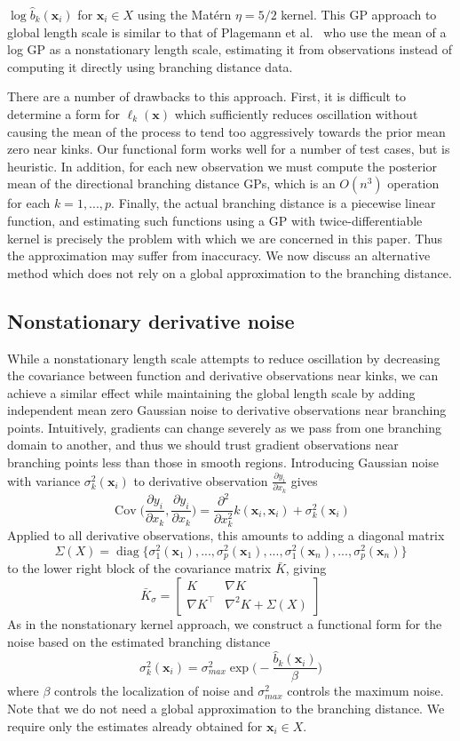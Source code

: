 \documentclass{article}
\newcommand{\mat}[1]{\begin{bmatrix}#1\end{bmatrix}}
\renewcommand{\vec}[1]{\mathbf{#1}}
\DeclareMathOperator{\Cov}{Cov}
\DeclareMathOperator{\diag}{diag}
\begin{document}
$\log \hat{b}_k(\vec{x}_i)$ for $\vec{x}_i \in X$ using the Mat\'ern $\eta = 5/2$ kernel. This GP approach to global length scale is similar to that of Plagemann et al.~\cite{plagemann2008nonstationary} who use the mean of a log GP as a nonstationary length scale, estimating it from observations instead of computing it directly using branching distance data.

There are a number of drawbacks to this approach. First, it is difficult to determine a form for $\ell_k(\vec{x})$ which sufficiently reduces oscillation without causing the mean of the process to tend too aggressively towards the prior mean zero near kinks. Our functional form works well for a number of test cases, but is heuristic. In addition, for each new observation we must compute the posterior mean of the directional branching distance GPs, which is an $O(n^3)$ operation for each $k=1,...,p$. Finally, the actual branching distance is a piecewise linear function, and estimating such functions using a GP with twice-differentiable kernel is precisely the problem with which we are concerned in this paper. Thus the approximation may suffer from inaccuracy. We now discuss an alternative method which does not rely on a global approximation to the branching distance.

\subsection{Nonstationary derivative noise}
While a nonstationary length scale attempts to reduce oscillation by decreasing the covariance between function and derivative observations near kinks, we can achieve a similar effect while maintaining the global length scale by adding independent mean zero Gaussian noise to derivative observations near branching points. Intuitively, gradients can change severely as we pass from one branching domain to another, and thus we should trust gradient observations near branching points less than those in smooth regions. Introducing Gaussian noise with variance $\sigma^2_k(\vec{x}_i)$ to derivative observation $\frac{\partial y_i}{\partial x_k}$ gives
$$ \Cov\Big(\frac{\partial y_i}{\partial x_k}, \frac{\partial y_i}{\partial x_k}\Big) = \frac{\partial^2}{\partial x_k^2} k(\vec{x}_i, \vec{x}_i) + \sigma^2_k(\vec{x}_i) $$
Applied to all derivative observations, this amounts to adding a diagonal matrix
$$\Sigma(X) = \diag\{\sigma^2_1(\vec{x}_1),...,\sigma^2_p(\vec{x}_1),...,\sigma^2_1(\vec{x}_n),...,\sigma^2_p(\vec{x}_n)\}$$
to the lower right block of the covariance matrix $\bar{K}$, giving
$$ \bar{K}_\sigma = \mat{K & \nabla K \\ \nabla K^\top & \nabla^2 K + \Sigma(X)} $$
As in the nonstationary kernel approach, we construct a functional form for the noise based on the estimated branching distance
$$ \sigma^2_k(\vec{x}_i) = \sigma^2_{max} \exp\bigg(- \frac{\hat{b}_k(\vec{x}_i)}{\beta}\bigg) $$
where $\beta$ controls the localization of noise and $\sigma_{max}^2$ controls the maximum noise. Note that we do not need a global approximation to the branching distance. We require only the estimates already obtained for $\vec{x}_i \in X$.
\end{document}

